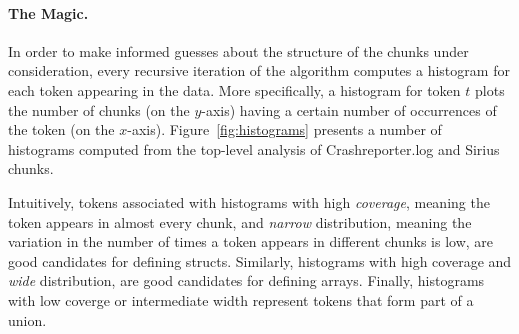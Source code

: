 

\paragraph*{The Magic.}
In order to make informed guesses about the structure of the chunks
under consideration, every recursive iteration of the algorithm computes 
a histogram for each token appearing in the data.
More specifically, a histogram for token $t$
plots the number of chunks (on the $y$-axis)
having a certain number of occurrences of the token (on the $x$-axis). 
Figure~\ref{fig:histograms} presents a number of histograms computed
from the top-level analysis of Crashreporter.log and Sirius chunks.

Intuitively, tokens associated 
with histograms with high {\em coverage}, meaning the token appears
in almost every chunk, and {\em narrow} distribution, meaning the variation in
the number of times a token appears in different chunks is low, are
good candidates for defining structs.  Similarly, histograms with
high coverage and {\em wide} distribution, are good candidates for defining
arrays.  Finally, histograms with low coverge or intermediate width
represent tokens that form part of a union.  


\begin {figure*}
\begin{center}
\begin{minipage}[t]{0.5\columnwidth}
\end{minipage}
\begin{minipage}[t]{0.5\columnwidth}
\end{minipage}
\begin{minipage}[t]{0.5\columnwidth}
\end{minipage}
\begin{minipage}[t]{0.5\columnwidth}
\end{minipage}
%
%
%
\caption{Histograms (a), (b), (c), (d), (e), (f) and
(g) are generated from top-level analysis of Crashreporter.log tokens.
The corresponding tokens are (a) {\tt [*]}, 
(b)  {\tt Pint}, (c) {\tt PDate}, (d) {\tt PTime}, (e) {\tt -}, (f) {\tt Palpha} and
(g) {\tt Pwhite}.  Histograms (h) {\tt Palpha}, (i) {\tt Pint}, and 
(j) {\tt Pwhite} are generated from analysis of Crashreporter.log from
set 1 (the second level of recursion).  Histogram (k) is generated from
top-level analysis of the {\tt |} token from Dibbler.1000.}
\label{fig:histograms} 
\end{center}
\end{figure*}

